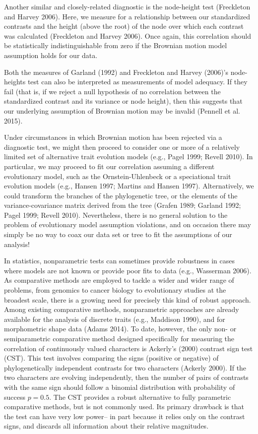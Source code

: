\documentclass[fleqn,10pt,lineno]{wlpeerj} %
\begin{document}
Another similar and closely-related diagnostic is the node-height test (Freckleton and Harvey 2006). Here, we measure for a relationship between our standardized contrasts and the height (above the root) of the node over which each contrast was calculated (Freckleton and Harvey 2006). Once again, this correlation should be statistically indistinguishable from zero if the Brownian motion model assumption holds for our data.

Both the measures of Garland (1992) and Freckleton and Harvey (2006)'s node-heights test can also be interpreted as measurements of model adequacy. If they fail (that is, if we reject a null hypothesis of no correlation between the standardized contrast and its variance or node height), then this suggests that our underlying assumption of Brownian motion may be invalid (Pennell et al. 2015).

Under circumstances in which Brownian motion has been rejected via a diagnostic test, we might then proceed to consider one or more of a relatively limited set of alternative trait evolution models (e.g., Pagel 1999; Revell 2010). In particular, we may proceed to fit our correlation assuming a different evolutionary model, such as the Ornstein-Uhlenbeck or a speciational trait evolution models (e.g., Hansen 1997; Martins and Hansen 1997). Alternatively, we could transform the branches of the phylogenetic tree, or the elements of the variance-covariance matrix derived from the tree (Grafen 1989; Garland 1992; Pagel 1999; Revell 2010). Nevertheless, there is no general solution to the problem of evolutionary model assumption violations, and on occasion there may simply be no way to coax our data set or tree to fit the assumptions of our analysis!

In statistics, nonparametric tests can sometimes provide robustness in cases where models are not known or provide poor fits to data (e.g., Wasserman 2006). As comparative methods are employed to tackle a wider and wider range of problems, from genomics to cancer biology to evolutionary studies at the broadest scale, there is a growing need for precisely this kind of robust approach. Among existing comparative methods, nonparametric approaches are already available for the analysis of discrete traits (e.g., Maddison 1990), and for morphometric shape data (Adams 2014). To date, however, the only non- or semiparametric comparative method designed specifically for measuring the correlation of continuously valued characters is Ackerly's (2000) contrast sign test (CST). This test involves comparing the signs (positive or negative) of phylogenetically independent contrasts for two characters (Ackerly 2000). If the two characters are evolving independently, then the number of pairs of contrasts with the same sign should follow a binomial distribution with probability of success \(p=0.5\). The CST provides a robust alternative to fully parametric comparative methods, but is not commonly used. Its primary drawback is that the test can have very low power-- in part because it relies only on the contrast signs, and discards all information about their relative magnitudes.
\end{document}
